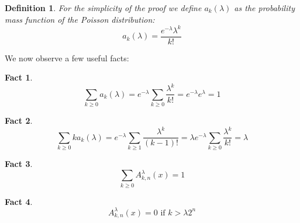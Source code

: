 \documentclass[11pt,a4paper]{tesis}
\newtheorem{fact}{Fact}[]
\newtheorem{definition}{Definition}[]
\newcommand{\note}[1]{\textbf{\color{red}{#1}}}
\begin{document}
\begin{definition} 
  For the simplicity of the proof we define $a_k(\lambda)$ as the probability mass function of the Poisson distribution:
   $$a_k(\lambda) = \frac{e^{-\lambda}\lambda^k}{k!}$$
\end{definition}

We now observe a few useful facts:

\begin{fact}
    $$\sum_{k \geq 0} a_k(\lambda) = e^{-\lambda}\sum_{k \geq 0} \frac{\lambda^k}{k!} = e^{-\lambda}e^{\lambda} = 1$$
\end{fact}

\begin{fact}
    $$\sum_{k \geq 0} ka_k(\lambda) = e^{-\lambda}\sum_{k \geq 1} \frac{\lambda^k}{(k-1)!} = \lambda e^{-\lambda} \sum_{k \geq 0} \frac{\lambda^k}{k!}= \lambda$$
\end{fact}





\begin{fact}
    $$\sum_{k \geq 0} A^{\lambda}_{k,n}(x) = 1$$
\end{fact}

\begin{fact}
    $$A^{\lambda}_{k,n}(x) = 0 \textrm{ if } k > \lambda2^n$$
\end{fact}





\end{document}
